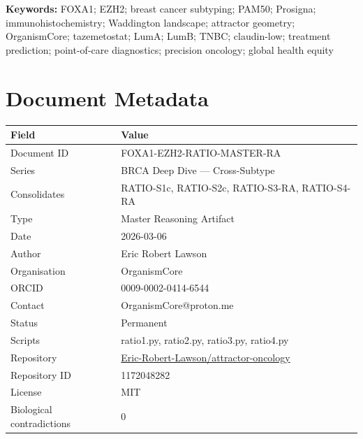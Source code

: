 \documentclass[12pt, a4paper]{article}
\begin{document}
\vspace{0.5em}
\noindent\textbf{Keywords:}
FOXA1; EZH2; breast cancer subtyping; PAM50; Prosigna;
immunohistochemistry; Waddington landscape; attractor
geometry; OrganismCore; tazemetostat; LumA; LumB; TNBC;
claudin-low; treatment prediction; point-of-care diagnostics;
precision oncology; global health equity

\newpage
\tableofcontents
\newpage

\section{Document Metadata}

\begin{center}
\begin{tabular}{ll}
\toprule
\textbf{Field} & \textbf{Value} \\
\midrule
Document ID     & FOXA1-EZH2-RATIO-MASTER-RA \\
Series          & BRCA Deep Dive --- Cross-Subtype \\
Consolidates    & RATIO-S1c, RATIO-S2c, RATIO-S3-RA,
                  RATIO-S4-RA \\
Type            & Master Reasoning Artifact \\
Date            & 2026-03-06 \\
Author          & Eric Robert Lawson \\
Organisation    & OrganismCore \\
ORCID           & 0009-0002-0414-6544 \\
Contact         & OrganismCore@proton.me \\
Status          & Permanent \\
Scripts         & ratio1.py, ratio2.py, ratio3.py, ratio4.py \\
Repository      &
  \href{https://github.com/Eric-Robert-Lawson/attractor-oncology}
       {Eric-Robert-Lawson/attractor-oncology} \\
Repository ID   & 1172048282 \\
License         & MIT \\
Biological contradictions & 0 \\
\bottomrule
\end{tabular}
\end{center}

\end{document}
